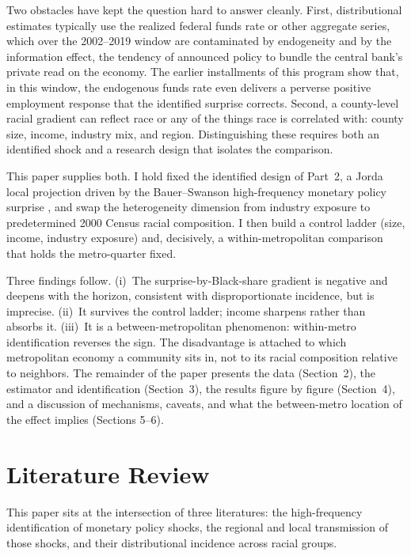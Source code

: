 \documentclass[11pt]{article}
\begin{document}
Two obstacles have kept the question hard to answer cleanly. First, distributional estimates
typically use the realized federal funds rate or other aggregate series, which over the
2002--2019 window are contaminated by endogeneity and by the information effect, the tendency
of announced policy to bundle the central bank's private read on the economy. The earlier
installments of this program show that, in this window, the endogenous funds rate even
delivers a perverse positive employment response that the identified surprise corrects.
Second, a county-level racial gradient can reflect race or any of the things race is
correlated with: county size, income, industry mix, and region. Distinguishing these
requires both an identified shock and a research design that isolates the comparison.

This paper supplies both. I hold fixed the identified design of Part~2, a Jorda local
projection driven by the Bauer--Swanson high-frequency monetary policy surprise
\citep{BauerSwanson2023, Jorda2005}, and swap the heterogeneity dimension from industry
exposure to predetermined 2000 Census racial composition. I then build a control ladder
(size, income, industry exposure) and, decisively, a within-metropolitan comparison that
holds the metro-quarter fixed.

Three findings follow. (i)~The surprise-by-Black-share gradient is negative and deepens with
the horizon, consistent with disproportionate incidence, but is imprecise. (ii)~It survives
the control ladder; income sharpens rather than absorbs it. (iii)~It is a between-metropolitan
phenomenon: within-metro identification reverses the sign. The disadvantage is attached to
which metropolitan economy a community sits in, not to its racial composition relative to
neighbors. The remainder of the paper presents the data (Section~2), the estimator and
identification (Section~3), the results figure by figure (Section~4), and a discussion of
mechanisms, caveats, and what the between-metro location of the effect implies (Sections 5--6).

\section{Literature Review}
This paper sits at the intersection of three literatures: the high-frequency
identification of monetary policy shocks, the regional and local transmission of those
shocks, and their distributional incidence across racial groups.
\end{document}
